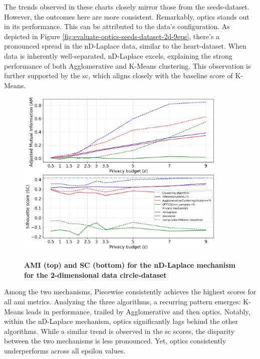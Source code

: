The trends observed in these charts closely mirror those from the seeds-dataset. However, the outcomes here are more consistent.
Remarkably, \gls{optics} stands out in its performance. This can be attributed to the data's configuration.
As depicted in Figure \ref{fig:evaluate-optics-seeds-dataset-2d-9eps}, there's a pronounced spread in the nD-Laplace data, similar to the heart-dataset.
When data is inherently well-separated, nD-Laplace excels, explaining the strong performance of both Agglomerative and K-Means clustering.
This observation is further supported by the \gls{sc}, which aligns closely with the baseline score of K-Means.
\newpage
\begin{figure}[H]
  \centering
  \caption{\textbf{AMI (top) and SC (bottom) for the nD-Laplace mechanism for the 2-dimensional data circle-dataset}}
  \includegraphics[width=0.9\textwidth]{Results/nd-laplace/nd-Laplace/circle-dataset/ami-and-sc_2_dimensions.png}
  \label{fig:validation-circle-dataset_comparison_2d-laplace}
\end{figure}
Among the two mechanisms, Piecewise consistently achieves the highest scores for all \gls{ami} metrics. Analyzing the three algorithms, a recurring pattern emerges: K-Means leads in performance, trailed by Agglomerative and then \gls{optics}. Notably, within the nD-Laplace mechanism, \gls{optics} significantly lags behind the other algorithms. While a similar trend is observed in the \gls{sc} scores, the disparity between the two mechanisms is less pronounced. Yet, \gls{optics} consistently underperforms across all epsilon values.

